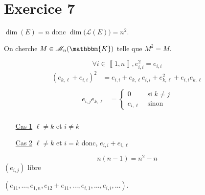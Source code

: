 \part{Exercice 7}

$\dim(E) = n$ donc $\dim\big(\mathcal{L}(E)\big) = n^2$.

On cherche $M \in \mathcal{M}_{n}(\mathbbm{K})$ telle que $M^2 = M$.

\[
	\forall i \in \left\llbracket 1,n \right\rrbracket, e_{i,i}^2 = e_{i,i}
\]\vspace{-5mm}
\begin{align*}
	(e_{k,\ell} + e_{i,i})^2 &= e_{i,i} + e_{k,\ell} e_{i,i} + e_{k,\ell}^2 + e_{i,i}e_{k,\ell} \\
\end{align*}\vspace{-5mm}
\begin{align*}
	e_{i,j}e_{k,\ell} &= \begin{cases}
		0 &\text{ si } k \neq j\\
		e_{i,\ell} &\text{ sinon}
	\end{cases} \\
\end{align*}

\begin{itemize}
	\item[\underline{\sc Cas 1}] $\ell \neq k$ et $i \neq k$
	\item[\underline{\sc Cas 2}] $\ell \neq k$ et $i = k$
		donc, $e_{i,i} + e_{i,\ell}$
\end{itemize}

\[
	n(n-1) = n^2 - n
\]
$(e_{i,j})$ libre

$(e_{11}, \ldots, e_{1,n}, e_{12} + e_{11}, \ldots, e_{i,1}, \ldots, e_{i,i}, \ldots)$.



